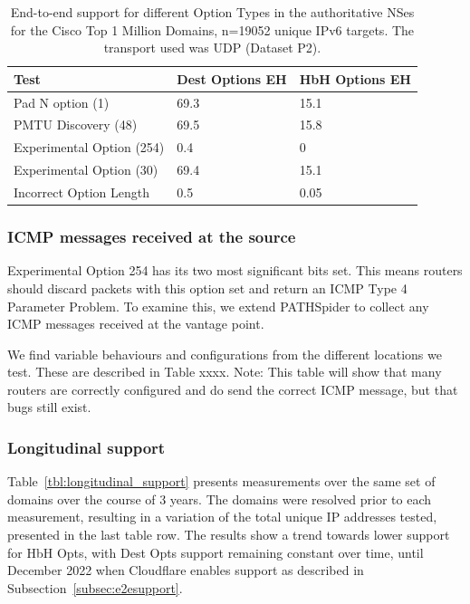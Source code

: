 \documentclass[conference]{IEEEtran}
\begin{document}
\begin{table}[]
\begin{tabular}{l|l|l}
Test                      & Dest Options EH & HbH Options EH \\
\hline
Pad N option (1)          & 69.3           & 15.1          \\
PMTU Discovery (48)       & 69.5           & 15.8          \\
Experimental Option (254) & 0.4            & 0             \\
Experimental Option (30)  & 69.4           & 15.1          \\
Incorrect Option Length   & 0.5            & 0.05            
\end{tabular}
\label{tbl:option_type_support}
\caption{End-to-end support for different Option Types in the authoritative NSes for the Cisco Top 1 Million Domains, n=19052 unique IPv6 targets. The transport used was UDP (Dataset P2).}
\end{table}

\subsubsection{ICMP messages received at the source}

Experimental Option 254 has its two most significant bits set. This means routers should discard packets with this option set and return an ICMP Type 4 Parameter Problem. To examine this, we extend PATHSpider to collect any ICMP messages received at the vantage point. 

We find variable behaviours and configurations from the different locations we test. These are described in Table xxxx. Note: This table will show that many routers are correctly configured and do send the correct ICMP message, but that bugs still exist.


\subsubsection{Longitudinal support}

Table~\ref{tbl:longitudinal_support} presents measurements over the same set of domains over the course of 3 years. The domains were resolved prior to each measurement, resulting in a variation of the total unique IP addresses tested, presented in the last table row. The results show a trend towards lower support for HbH Opts, with Dest Opts support remaining constant over time, until December 2022 when Cloudflare enables support as described in Subsection~\ref{subsec:e2esupport}.
\end{document}
